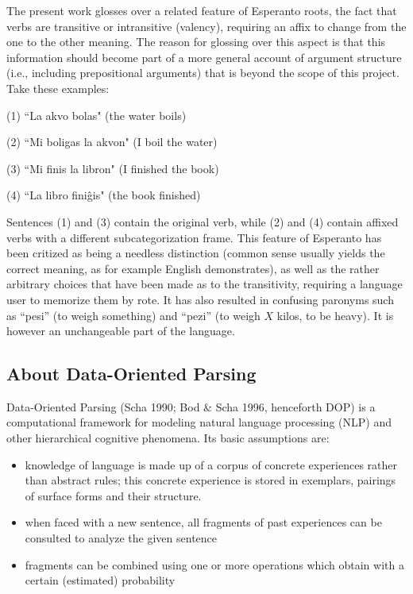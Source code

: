 \documentclass[10pt,a4paper]{article}
\begin{document}
The present work glosses over a related feature of Esperanto roots, the fact
that verbs are transitive or intransitive (valency), requiring an affix to
change from the one to the other meaning. The reason for glossing over this
aspect is that this information should become part of a more general account of
argument structure (i.e., including prepositional arguments) that is beyond the
scope of this project. Take these examples:

(1) ``La akvo bolas" (the water boils)

(2) ``Mi boligas la akvon" (I boil the water)

(3) ``Mi finis la libron" (I finished the book)

(4) ``La libro fini\^gis" (the book finished)

Sentences (1) and (3) contain the original verb, while (2) and (4) contain
affixed verbs with a different subcategorization frame. This feature of
Esperanto has been critized as being a needless distinction (common sense
usually yields the correct meaning, as for example English demonstrates),
as well as the rather arbitrary choices that have been made as to the
transitivity, requiring a language user to memorize them by
rote. It has also resulted in confusing paronyms such as ``pesi'' (to weigh
something) and ``pezi'' (to weigh $X$ kilos, to be heavy). It is however an
unchangeable part of the language.

\subsection{About Data-Oriented Parsing}

Data-Oriented Parsing (Scha 1990; Bod \& Scha 1996, henceforth DOP) is a
computational framework for modeling natural language processing (NLP) and
other hierarchical cognitive phenomena. Its basic assumptions are:

\begin{itemize}
\item knowledge of language is made up of a corpus of concrete experiences
rather than abstract rules; this concrete experience is stored in
exemplars, pairings of surface forms and their structure.
\item when faced with a new sentence, all fragments of past experiences can be
consulted to analyze the given sentence
\item fragments can be combined using one or more operations which obtain with a
certain (estimated) probability
\end{itemize}
\end{document}
